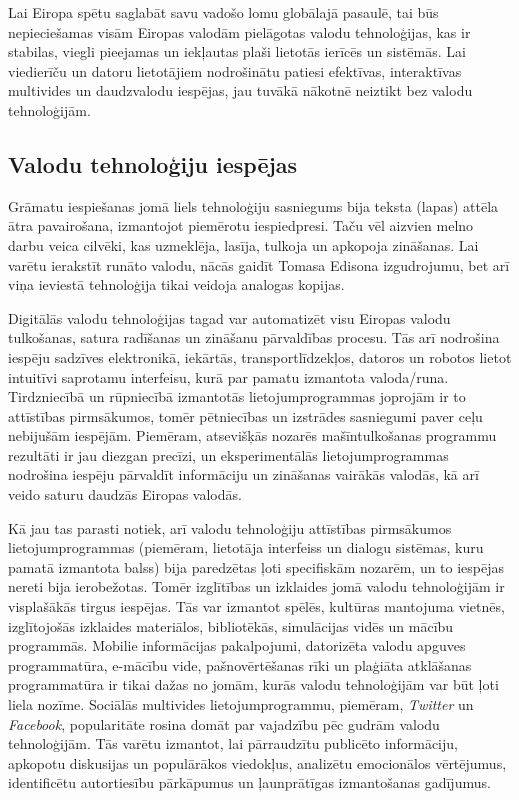 \begin{multicols}{2}

Lai Eiropa spētu saglabāt savu vadošo lomu globālajā pasaulē, tai būs nepieciešamas visām Eiropas valodām pielāgotas valodu tehnoloģijas, kas ir stabilas, viegli pieejamas un iekļautas plaši lietotās ierīcēs un sistēmās. 
Lai viedierīču un datoru lietotājiem nodrošinātu patiesi efektīvas, interaktīvas multivides un daudzvalodu iespējas, jau tuvākā nākotnē neiztikt bez valodu tehnoloģijām. 
\subsection{Valodu tehnoloģiju iespējas}

Grāmatu iespiešanas jomā liels tehnoloģiju sasniegums bija teksta (lapas) attēla ātra pavairošana, izmantojot piemērotu iespiedpresi. 
Taču vēl aizvien melno darbu veica cilvēki, kas uzmeklēja, lasīja, tulkoja un apkopoja zināšanas. 
Lai varētu ierakstīt runāto valodu, nācās gaidīt Tomasa Edisona izgudrojumu, bet arī viņa ieviestā tehnoloģija tikai veidoja analogas kopijas.

Digitālās valodu tehnoloģijas tagad var automatizēt visu Eiropas valodu tulkošanas, satura radīšanas un zināšanu pārvaldības procesu. 
Tās arī nodrošina iespēju sadzīves elektronikā, iekārtās, transportlīdzekļos, datoros un robotos lietot intuitīvi saprotamu interfeisu, kurā par pamatu izmantota valoda/runa. 
Tirdzniecībā un rūpniecībā izmantotās lietojumprogrammas joprojām ir to attīstības pirmsākumos, tomēr pētniecības un izstrādes sasniegumi paver ceļu nebijušām iespējām. 
Piemēram, atsevišķās nozarēs mašīntulkošanas programmu rezultāti ir jau diezgan precīzi, un eksperimentālās lietojumprogrammas nodrošina iespēju pārvaldīt informāciju un zināšanas vairākās valodās, kā arī veido saturu daudzās Eiropas valodās. 

Kā jau tas parasti notiek, arī valodu tehnoloģiju attīstības pirmsākumos lietojumprogrammas (piemēram, lietotāja interfeiss un dialogu sistēmas, kuru pamatā izmantota balss) bija paredzētas ļoti specifiskām nozarēm, un to iespējas nereti bija ierobežotas. 
Tomēr izglītības un izklaides jomā valodu tehnoloģijām ir visplašākās tirgus iespējas. 
Tās var izmantot spēlēs, kultūras mantojuma vietnēs, izglītojošās izklaides materiālos, bibliotēkās, simulācijas vidēs un mācību programmās. 
Mobilie informācijas pakalpojumi, datorizēta valodu apguves programmatūra, e-mācību vide, pašnovērtēšanas rīki un plaģiāta atklāšanas programmatūra ir tikai dažas no jomām, kurās valodu tehnoloģijām var būt ļoti liela nozīme. 
Sociālās multivides lietojumprogrammu, piemēram, \textit{Twitter} un \textit{Facebook}, popularitāte rosina domāt par vajadzību pēc gudrām valodu tehnoloģijām. 
Tās varētu izmantot, lai pārraudzītu publicēto informāciju, apkopotu diskusijas un populārākos viedokļus, analizētu emocionālos vērtējumus, identificētu autortiesību pārkāpumus un ļaunprātīgas izmantošanas gadījumus.


\end{multicols}
